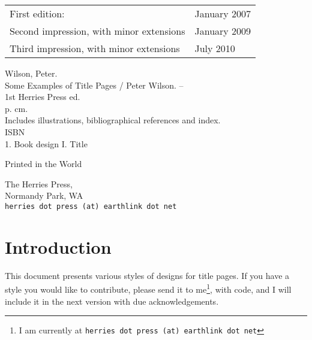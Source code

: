 \documentclass{memoir}
\newcommand*{\plogo}{\fbox{$\mathcal{PL}$}}
\begin{document}
\begin{center}
  \begin{tabular}{ll}
    First edition:                           & January 2007 \\
    Second impression, with minor extensions & January 2009 \\
    Third impression, with minor extensions  & July 2010
  \end{tabular}
\end{center}

\vfill

Wilson, Peter.\\
\hspace*{2em} Some Examples of Title Pages / Peter Wilson. -- \\
\hspace*{1em} 1st Herries Press ed. \\
\hspace*{2em} p. \hspace*{2em} cm. \\
\hspace*{2em} Includes illustrations, bibliographical references and index. \\
\hspace*{2em} ISBN \\
\hspace*{2em} 1. Book design \hspace*{2em} I. Title


\vfill

Printed in the World

The Herries Press, \\
Normandy Park, WA \\
\texttt{herries dot press (at) earthlink dot net}

\vspace*{2\baselineskip}


\endgroup
\clearpage
\pagestyle{plain}

\tableofcontents
\cleardoublepage
\mainmatter

\chapter{Introduction}

This document presents various styles of designs for
title pages.
If you have a style you would like to contribute, please send it to
me\footnote{I am currently at \texttt{herries dot press (at) earthlink dot net}},
with code, and I will include it in the next version with due acknowledgements.
\end{document}
